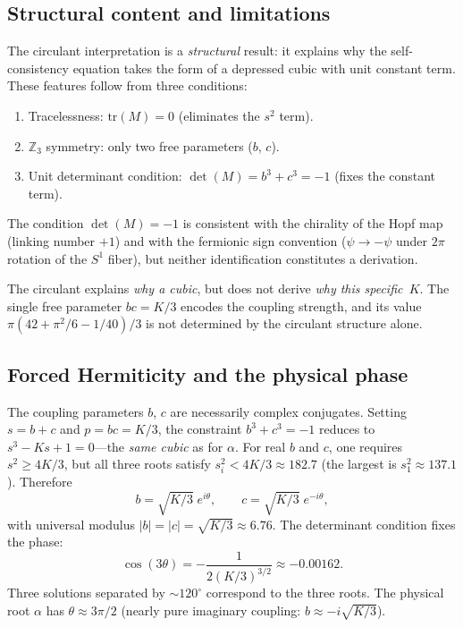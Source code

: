 \documentclass[aps,prl,twocolumn,superscriptaddress]{revtex4-2}
\begin{document}
\subsection{Structural content and limitations}

The circulant interpretation is a \textit{structural} result: it
explains why the self-consistency equation takes the form of a
depressed cubic with unit constant term. These features follow from
three conditions:
\begin{enumerate}
\item Tracelessness: $\mathrm{tr}(M) = 0$ (eliminates the $s^2$ term).
\item $\mathbb{Z}_3$ symmetry: only two free parameters ($b$, $c$).
\item Unit determinant condition: $\det(M) = b^3 + c^3 = -1$ (fixes
  the constant term).
\end{enumerate}

The condition $\det(M) = -1$ is consistent with the chirality of the
Hopf map (linking number $+1$) and with the fermionic sign convention
($\psi \to -\psi$ under $2\pi$ rotation of the $S^1$ fiber), but
neither identification constitutes a derivation.

The circulant explains \textit{why a cubic}, but does not derive
\textit{why this specific~$K$}. The single free parameter $bc = K/3$
encodes the coupling strength, and its value
$\pi(42 + \pi^2/6 - 1/40)/3$ is not determined by the circulant
structure alone.

\subsection{Forced Hermiticity and the physical phase}

The coupling parameters $b$, $c$ are necessarily complex conjugates.
Setting $s = b + c$ and $p = bc = K/3$, the constraint $b^3 + c^3 = -1$
reduces to $s^3 - Ks + 1 = 0$---the \textit{same cubic} as for
$\alpha$. For real $b$ and $c$, one requires $s^2 \geq 4K/3$, but all
three roots satisfy $s_i^2 < 4K/3 \approx 182.7$ (the largest is
$s_1^2 \approx 137.1$). Therefore~\cite{phase3_audit}
\begin{equation}\label{eq:polar}
  b = \sqrt{K/3}\; e^{i\theta}, \qquad
  c = \sqrt{K/3}\; e^{-i\theta},
\end{equation}
with universal modulus $|b| = |c| = \sqrt{K/3} \approx 6.76$. The
determinant condition fixes the phase:
\begin{equation}\label{eq:phase}
  \cos(3\theta) = -\frac{1}{2(K/3)^{3/2}} \approx -0.00162.
\end{equation}
Three solutions separated by ${\sim}120^\circ$ correspond to the
three roots. The physical root $\alpha$ has $\theta \approx 3\pi/2$
(nearly pure imaginary coupling: $b \approx -i\sqrt{K/3}$).
\end{document}
